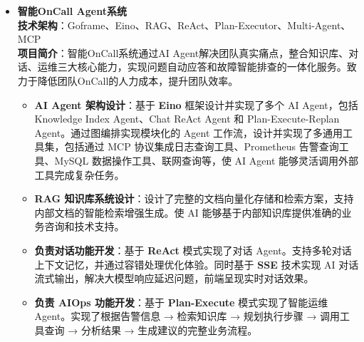 \documentclass[zh]{resume}
\begin{document}
\begin{itemize}
  \item \textbf{智能OnCall Agent系统} %
  \\ \textbf{技术架构}：Goframe、Eino、RAG、ReAct、Plan-Executor、Multi-Agent、MCP
  \\ \textbf{项目简介}：智能OnCall系统通过AI Agent解决团队真实痛点，整合知识库、对话、运维三大核心能力，实现问题自动应答和故障智能排查的一体化服务。致力于降低团队OnCall的人力成本，提升团队效率。
    \begin{itemize}
      \item \textbf{AI Agent 架构设计}：基于 \textbf{Eino} 框架设计并实现了多个 AI Agent，包括 Knowledge Index Agent、Chat ReAct Agent 和 Plan-Execute-Replan Agent。通过图编排实现模块化的 Agent 工作流，设计并实现了多通用工具集，包括通过 MCP 协议集成日志查询工具、Prometheus 告警查询工具、MySQL 数据操作工具、联网查询等，使 AI Agent 能够灵活调用外部工具完成复杂任务。
      \item \textbf{RAG 知识库系统设计}：设计了完整的文档向量化存储和检索方案，支持内部文档的智能检索增强生成。使 AI 能够基于内部知识库提供准确的业务咨询和技术支持。
      \item \textbf{负责对话功能开发}：基于 \textbf{ReAct} 模式实现了对话 Agent。支持多轮对话上下文记忆，并通过容错处理优化体验。同时基于 \textbf{SSE} 技术实现 AI 对话流式输出，解决大模型响应延迟问题，前端呈现实时对话效果。
      \item \textbf{负责 AIOps 功能开发}：基于 \textbf{Plan-Execute} 模式实现了智能运维 Agent。实现了根据告警信息 → 检索知识库 → 规划执行步骤 → 调用工具查询 → 分析结果 → 生成建议的完整业务流程。
    \end{itemize}
\end{itemize}

\end{document}
